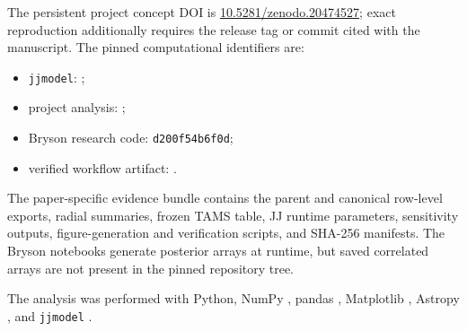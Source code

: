 The persistent project concept DOI is \href{https://doi.org/10.5281/zenodo.20474527}{10.5281/zenodo.20474527}; exact reproduction additionally requires the release tag or commit cited with the manuscript. The pinned computational identifiers are:
\begin{itemize}
\item \texttt{jjmodel}: ;
\item project analysis: ;
\item Bryson research code: \texttt{d200f54b6f0d};
\item verified workflow artifact: .
\end{itemize}
The paper-specific evidence bundle contains the parent and canonical row-level exports, radial summaries, frozen TAMS table, JJ runtime parameters, sensitivity outputs, figure-generation and verification scripts, and SHA-256 manifests. The Bryson notebooks generate posterior arrays at runtime, but saved correlated arrays are not present in the pinned repository tree.

The analysis was performed with Python, NumPy \citep{Harris2020}, pandas \citep{McKinney2010}, Matplotlib \citep{Hunter2007}, Astropy \citep{Astropy2022}, and \texttt{jjmodel} \citep{Sysoliatina2022}.
